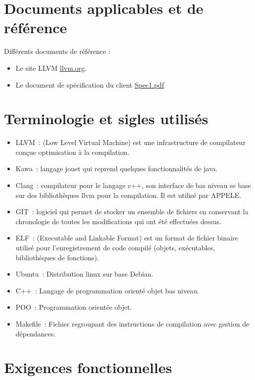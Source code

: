 \documentclass{../res/univ-projet}
\begin{document}
\section{Documents applicables et de référence}
Différents documents de référence :
\begin{itemize}

\item Le site LLVM \href{http://llvm.org}{llvm.org}.
\item Le document de spécification du client \href{file:../client/spec1.pdf}{Spec1.pdf}
\end{itemize}

\section{Terminologie et sigles utilisés}
  \begin{itemize}
  	\item LLVM : (Low Level Virtual Machine) est une infrastructure de compilateur conçue optimisation à la compilation.
	\item Kawa : langage jouet qui reprend quelques fonctionnalités de java.
	\item Clang : compilateur pour le langage c++, son interface de bas niveau  se base sur des bibliothèques llvm pour la compilation. Il est utilisé par APPELE.
	\item GIT : logiciel qui permet de stocker un ensemble de fichiers en conservant la chronologie de toutes les modifications qui ont été effectuées dessus.
	\item ELF : (Executable and Linkable Format) est un format de fichier binaire utilisé pour l'enregistrement de code compilé (objets, exécutables, bibliothèques de fonctions).
	\item Ubuntu : Distribution linux sur base Debian.
	\item C++ : Langage de programmation orienté objet bas niveau.
	\item POO : Programmation orientée objet.
	\item Makefile : Fichier regroupant des instructions de compilation avec gestion de dépendances.
  \end{itemize}

\section{Exigences fonctionnelles}
\end{document}
